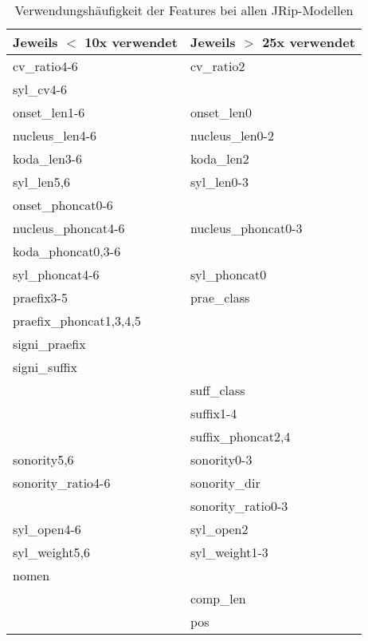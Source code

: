 \begin{table}
    \centering
    \small
    \caption{Verwendungshäufigkeit der Features bei allen JRip-Modellen}
    \label{table:jrip_occurences}
    \begin{tabular}{|l|l|}
    \hline
    Jeweils $<$ 10x verwendet	& Jeweils $>$ 25x verwendet \\ \hline
    cv\_ratio4-6	& cv\_ratio2 \\
    syl\_cv4-6	& \\ \hline
    onset\_len1-6	& onset\_len0 \\
    nucleus\_len4-6	& nucleus\_len0-2 \\
    koda\_len3-6	& koda\_len2 \\
    syl\_len5,6 	& syl\_len0-3\\ \hline
    onset\_phoncat0-6 	&  \\
    nucleus\_phoncat4-6 	& nucleus\_phoncat0-3 \\
    koda\_phoncat0,3-6 	&  \\
    syl\_phoncat4-6 	& syl\_phoncat0\\ \hline
    praefix3-5 	& prae\_class \\
    praefix\_phoncat1,3,4,5 	& \\ \hline
    signi\_praefix 	&  \\
    signi\_suffix 	&  \\
    	& suff\_class \\
    	& suffix1-4 \\
    	& suffix\_phoncat2,4\\ \hline
    sonority5,6 	& sonority0-3 \\
    sonority\_ratio4-6 	& sonority\_dir \\
    	& sonority\_ratio0-3\\ \hline
    syl\_open4-6 	& syl\_open2 \\
    syl\_weight5,6 	& syl\_weight1-3\\ \hline
    nomen 	&  \\
    	& comp\_len \\
    	& pos \\ \hline
    \end{tabular}
\end{table}
